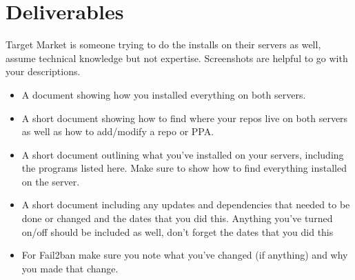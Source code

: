\documentclass[12pt]{article}
\begin{document}
\section*{Deliverables}
Target Market is someone trying to do the installs on their servers as well, assume technical knowledge but not expertise.  Screenshots are helpful to go with your descriptions. 

\begin{itemize}
    \item A document showing how you installed everything on both servers.
    \item A short document showing how to find where your repos live on both servers as well as how to add/modify a repo or PPA.
    \item A short document outlining what you've installed on your servers,  including the programs listed here. Make sure to show how to find everything installed on the server.
    \item A short document including any updates and dependencies that needed to be done or changed and the dates that you did this.  Anything you've turned on/off should be included as well, don't forget the dates that you did this
    \item For Fail2ban make sure you note what you've changed (if anything) and why you made that change.
\end{itemize}
\end{document}
